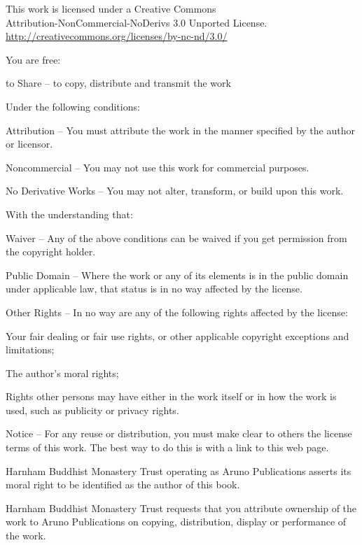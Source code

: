 \cleartorecto
{\tiny\setlength{\parindent}{0pt}%
\raggedright\label{copyright-details}
\setlength{\parskip}{5pt}
{\centering

{\large\ccbyncnd}

This work is licensed under a Creative Commons\\
Attribution-NonCommercial-NoDerivs 3.0 Unported License.\\
\href{http://creativecommons.org/licenses/by-nc-nd/3.0/}{http://creativecommons.org/licenses/by-nc-nd/3.0/}

}

You are free:
\begin{packeditemize}
  \item to Share -- to copy, distribute and transmit the work
\end{packeditemize}


Under the following conditions:

\begin{packeditemize}
\item Attribution -- You must attribute the work in the manner specified by the author or licensor.
\item Noncommercial -- You may not use this work for commercial purposes.
\item No Derivative Works -- You may not alter, transform, or build upon this work.
\end{packeditemize}

With the understanding that:

\begin{packeditemize}
    \item Waiver -- Any of the above conditions can be waived if you get permission from the copyright holder.
    \item Public Domain -- Where the work or any of its elements is in the public domain under applicable law, that status is in no way affected by the license.
    \item Other Rights -- In no way are any of the following rights affected by the license:
        \begin{packeditemize}
            \item Your fair dealing or fair use rights, or other applicable copyright exceptions and limitations;
            \item The author's moral rights;
            \item Rights other persons may have either in the work itself or in how the work is used, such as publicity or privacy rights.
        \end{packeditemize}
    \item Notice -- For any reuse or distribution, you must make clear to others the license terms of this work. The best way to do this is with a link to this web page.
\end{packeditemize}

Harnham Buddhist Monastery Trust operating as Aruno Publications asserts its moral right to be identified as the author of this book.

Harnham Buddhist Monastery Trust requests that you attribute ownership of the work to Aruno Publications on copying, distribution, display or performance of the work.

}
